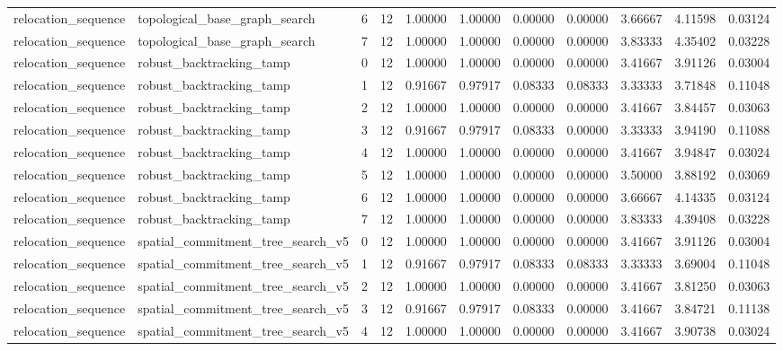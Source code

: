\documentclass{article}
\begin{document}
\begin{table}[tbp]
{\begin{tabular}{lllllllllll}
relocation\_sequence & topological\_base\_graph\_search & 6 & 12 & 1.00000 & 1.00000 & 0.00000 & 0.00000 & 3.66667 & 4.11598 & 0.03124 \\
relocation\_sequence & topological\_base\_graph\_search & 7 & 12 & 1.00000 & 1.00000 & 0.00000 & 0.00000 & 3.83333 & 4.35402 & 0.03228 \\
relocation\_sequence & robust\_backtracking\_tamp & 0 & 12 & 1.00000 & 1.00000 & 0.00000 & 0.00000 & 3.41667 & 3.91126 & 0.03004 \\
relocation\_sequence & robust\_backtracking\_tamp & 1 & 12 & 0.91667 & 0.97917 & 0.08333 & 0.08333 & 3.33333 & 3.71848 & 0.11048 \\
relocation\_sequence & robust\_backtracking\_tamp & 2 & 12 & 1.00000 & 1.00000 & 0.00000 & 0.00000 & 3.41667 & 3.84457 & 0.03063 \\
relocation\_sequence & robust\_backtracking\_tamp & 3 & 12 & 0.91667 & 0.97917 & 0.08333 & 0.00000 & 3.33333 & 3.94190 & 0.11088 \\
relocation\_sequence & robust\_backtracking\_tamp & 4 & 12 & 1.00000 & 1.00000 & 0.00000 & 0.00000 & 3.41667 & 3.94847 & 0.03024 \\
relocation\_sequence & robust\_backtracking\_tamp & 5 & 12 & 1.00000 & 1.00000 & 0.00000 & 0.00000 & 3.50000 & 3.88192 & 0.03069 \\
relocation\_sequence & robust\_backtracking\_tamp & 6 & 12 & 1.00000 & 1.00000 & 0.00000 & 0.00000 & 3.66667 & 4.14335 & 0.03124 \\
relocation\_sequence & robust\_backtracking\_tamp & 7 & 12 & 1.00000 & 1.00000 & 0.00000 & 0.00000 & 3.83333 & 4.39408 & 0.03228 \\
relocation\_sequence & spatial\_commitment\_tree\_search\_v5 & 0 & 12 & 1.00000 & 1.00000 & 0.00000 & 0.00000 & 3.41667 & 3.91126 & 0.03004 \\
relocation\_sequence & spatial\_commitment\_tree\_search\_v5 & 1 & 12 & 0.91667 & 0.97917 & 0.08333 & 0.08333 & 3.33333 & 3.69004 & 0.11048 \\
relocation\_sequence & spatial\_commitment\_tree\_search\_v5 & 2 & 12 & 1.00000 & 1.00000 & 0.00000 & 0.00000 & 3.41667 & 3.81250 & 0.03063 \\
relocation\_sequence & spatial\_commitment\_tree\_search\_v5 & 3 & 12 & 0.91667 & 0.97917 & 0.08333 & 0.00000 & 3.41667 & 3.84721 & 0.11138 \\
relocation\_sequence & spatial\_commitment\_tree\_search\_v5 & 4 & 12 & 1.00000 & 1.00000 & 0.00000 & 0.00000 & 3.41667 & 3.90738 & 0.03024 \\

\end{tabular}}
\end{table}
\end{document}
